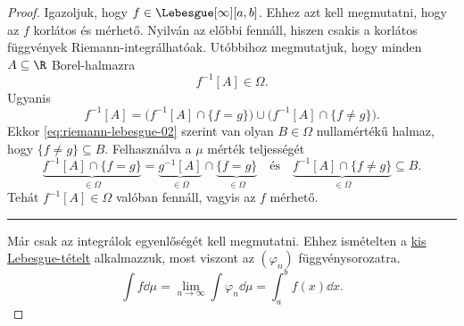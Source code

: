 \documentclass[
]{elteikthesis}[2024/04/26]
\begin{document}
\begin{proof}
		Igazoljuk, hogy \( f \in \Lebesgue[\infty][a, b] \).
		Ehhez azt kell megmutatni, hogy az \( f \) korlátos és mérhető.
		Nyilván az előbbi fennáll, hiszen csakis a korlátos függvények Riemann-integrálhatóak.
		Utóbbihoz megmutatjuk, hogy minden \( A \subseteq \R \) Borel-halmazra
		\[
			f^{-1}[A] \in \Omega.
		\]
		Ugyanis
		\[
			f^{-1}[A] =
			\bigl( f^{-1}[A] \cap \{ f = g \} \bigr) \cup 
			\bigl( f^{-1}[A] \cap \{ f \neq g \} \bigr).
		\]
		Ekkor \eqref{eq:riemann-lebesgue-02} szerint van olyan 
		\( B \in \Omega \) nullamértékű halmaz, 
		hogy \( \{ f \neq g \} \subseteq B \).
		Felhasználva a \( \mu \) mérték teljességét
		\[
			\underbrace{f^{-1}[A] \cap \{ f = g \}}_{\in \Omega} =
			\underbrace{g^{-1}[A]}_{\in \Omega} \cap \underbrace{\{ f = g \}}_{\in \Omega}
			\quad \text{és} \quad
			\underbrace{f^{-1}[A] \cap \{ f \neq g \}}_{\in \Omega} \subseteq B.
		\]
		Tehát \( f^{-1}[A] \in \Omega \) valóban fennáll, vagyis az \( f \) mérhető.

		\vspace{6pt}
		\hrule
		\vspace{9pt}

		Már csak az integrálok egyenlőségét kell megmutatni.
		Ehhez ismételten a \hyperref[th:kis-lebesgue]{kis Lebesgue-tételt} alkalmazzuk, 
		most viszont az \( (\varphi_n) \) függvénysorozatra.
		\[
			\int f \dd{\mu} =
			\lim_{n \to \infty} \int \varphi_n \dd{\mu} =
			\int_a^b f(x) \dd{x}.
		\]
	\end{proof}
	
\end{document}
